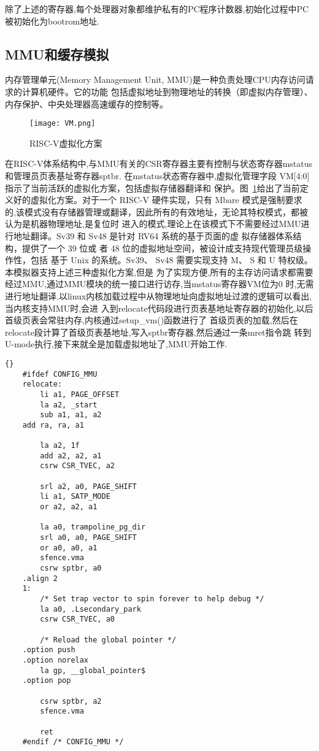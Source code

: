 除了上述的寄存器,每个处理器对象都维护私有的PC程序计数器,初始化过程中PC被初始化为bootrom地址.

\subsection{MMU和缓存模拟}

内存管理单元(Memory Management Unit, MMU)是一种负责处理CPU内存访问请求的计算机硬件。它的功能
包括虚拟地址到物理地址的转换（即虚拟内存管理）、内存保护、中央处理器高速缓存的控制等。
\begin{figure}[h]
    \centering
    \texttt{[image: VM.png]}
    \caption{RISC-V虚拟化方案}
    \label{fig:VM}
\end{figure}

在RISC-V体系结构中,与MMU有关的CSR寄存器主要有控制与状态寄存器mstatus和管理员页表基址寄存器sptbr.
在mstatus状态寄存器中,虚拟化管理字段 VM[4:0]指示了当前活跃的虚拟化方案，包括虚拟存储器翻译和
保护。图~\ref{fig:VM}给出了当前定义好的虚拟化方案。对于一个 RISC-V 硬件实现，只有 Mbare 模式是强制要求
的,该模式没有存储器管理或翻译，因此所有的有效地址，无论其特权模式，都被认为是机器物理地址,是复位时
进入的模式,理论上在该模式下不需要经过MMU进行地址翻译。Sv39 和 Sv48 是针对 RV64 系统的基于页面的虚
拟存储器体系结构，提供了一个 39 位或 者 48 位的虚拟地址空间，被设计成支持现代管理员级操作性，包括
基于 Unix 的系统。Sv39、 Sv48 需要实现支持 M、 S 和 U 特权级。本模拟器支持上述三种虚拟化方案,但是
为了实现方便,所有的主存访问请求都需要经过MMU,通过MMU模块的统一接口进行访存,当mstatus寄存器VM位为0
时,无需进行地址翻译.以linux内核加载过程中从物理地址向虚拟地址过渡的逻辑可以看出,当内核支持MMU时,会进
入到relocate代码段进行页表基地址寄存器的初始化,以后首级页表会常驻内存,内核通过setup\_vm()函数进行了
首级页表的加载,然后在relocate段计算了首级页表基地址,写入sptbr寄存器,然后通过一条mret指令跳
转到U-mode执行,接下来就全是加载虚拟地址了,MMU开始工作.
\begin{lstlisting}{}
    #ifdef CONFIG_MMU
    relocate:
        li a1, PAGE_OFFSET
        la a2, _start
        sub a1, a1, a2
    add ra, ra, a1
    
        la a2, 1f
        add a2, a2, a1
        csrw CSR_TVEC, a2
    
        srl a2, a0, PAGE_SHIFT
        li a1, SATP_MODE
        or a2, a2, a1
    
        la a0, trampoline_pg_dir
        srl a0, a0, PAGE_SHIFT
        or a0, a0, a1
        sfence.vma
        csrw sptbr, a0
    .align 2
    1:
        /* Set trap vector to spin forever to help debug */
        la a0, .Lsecondary_park
        csrw CSR_TVEC, a0
    
        /* Reload the global pointer */
    .option push
    .option norelax
        la gp, __global_pointer$
    .option pop
    
        csrw sptbr, a2
        sfence.vma
    
        ret
    #endif /* CONFIG_MMU */    
\end{lstlisting}


